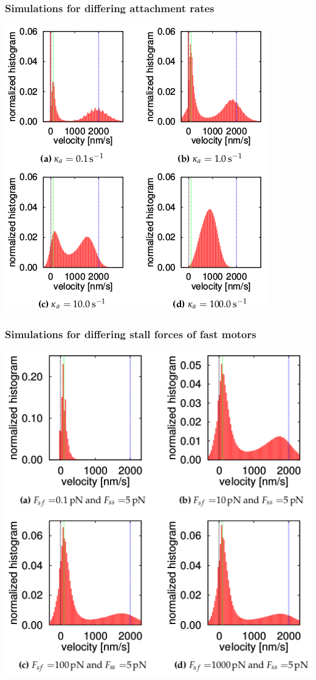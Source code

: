 \documentclass[11pt]{beamer}
\begin{document}
\begin{frame}
 \frametitle{Simulations for differing attachment rates}
 \centering
 \includegraphics[scale=.5]{img/sim-ar.png} 
\end{frame}

\begin{frame}
 \frametitle{Simulations for differing stall forces of fast motors}
 \centering
 \includegraphics[scale=.5]{img/sim-sff.png} 
\end{frame}
\end{document}
